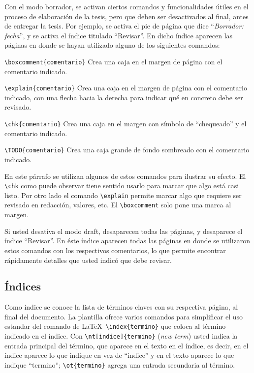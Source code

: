 Con el modo borrador, se activan ciertos comandos y funcionalidades útiles en
el proceso de elaboración de la tesis, pero que deben ser desactivados al
final, antes de entregar la tesis.  Por ejemplo, se activa el pie de página que
dice ``\emph{Borrador: fecha}'', y se activa el índice titulado ``Revisar''.  En dicho índice aparecen las páginas en donde se hayan utilizado alguno de los siguientes comandos:
\begin{compactitem}
\item \verb+\boxcomment{comentario}+ Crea una caja en el margen de página con
  el comentario indicado.
\item \verb+\explain{comentario}+ Crea una caja en el margen de página con
  el comentario indicado, con una flecha hacia la derecha para indicar qué en
  concreto debe ser revisado.
\item \verb+\chk{comentario}+ Crea una caja en el margen con símbolo de
  ``chequeado'' y el comentario indicado.
\item \verb+\TODO{comentario}+ Crea una caja grande de fondo sombreado con el
  comentario indicado.
\end{compactitem}

En este párrafo se utilizan algunos de estos comandos
para ilustrar su efecto.  El \verb+\chk+ como puede observar tiene sentido
usarlo para marcar que algo está casi listo.  Por otro lado 
el comando \verb+\explain+ permite marcar algo que requiere ser revisado en
redacción, valores, etc.  El \verb+\boxcomment+
solo pone una marca al margen.


Si usted desativa el modo draft, desaparecen todas las páginas, y desaparece el
índice ``Revisar''.  En éste índice aparecen todas las páginas en donde se
utilizaron estos comandos con los respectivos comentarios, lo que permite
encontrar rápidamente detalles que usted indicó que debe revisar.

\subsection{Índices}

Como índice se conoce la lista de términos claves con su respectiva página, al
final del documento.  La plantilla ofrece varios comandos para simplificar el
uso estandar del comando de \LaTeX\ \verb+\index{termino}+ que coloca al término
indicado en el índice.  Con \verb+\nt[indice]{termino}+ (\emph{new term}) usted
indica la entrada principal del término, que aparece en el texto en el índice,
es decir, en el índice aparece lo que indique en vez de ``indice'' y en el
texto aparece lo que indique ``termino''; \verb+\ot{termino}+ agrega una
entrada secundaria al término.
